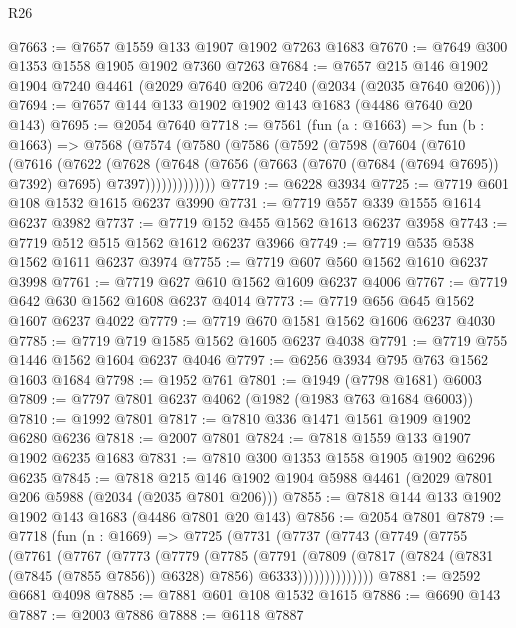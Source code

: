 \begin{lexlean}{R26}
\begin{coremodule}
@7663 := @7657 @1559 @133 @1907 @1902 @7263 @1683
@7670 := @7649 @300 @1353 @1558 @1905 @1902 @7360 @7263
@7684 := @7657 @215 @146 @1902 @1904 @7240 @4461 (@2029 @7640 @206 @7240 (@2034 (@2035 @7640 @206)))
@7694 := @7657 @144 @133 @1902 @1902 @143 @1683 (@4486 @7640 @20 @143)
@7695 := @2054 @7640
@7718 := @7561
    (fun (a : @1663) =>
    fun (b : @1663) =>
    @7568
      (@7574
        (@7580
          (@7586
            (@7592
              (@7598
                (@7604
                  (@7610
                    (@7616
                      (@7622
                        (@7628
                          (@7648
                            (@7656
                              (@7663 (@7670 (@7684 (@7694 @7695)) @7392) @7695)
                              @7397)))))))))))))
@7719 := @6228 @3934
@7725 := @7719 @601 @108 @1532 @1615 @6237 @3990
@7731 := @7719 @557 @339 @1555 @1614 @6237 @3982
@7737 := @7719 @152 @455 @1562 @1613 @6237 @3958
@7743 := @7719 @512 @515 @1562 @1612 @6237 @3966
@7749 := @7719 @535 @538 @1562 @1611 @6237 @3974
@7755 := @7719 @607 @560 @1562 @1610 @6237 @3998
@7761 := @7719 @627 @610 @1562 @1609 @6237 @4006
@7767 := @7719 @642 @630 @1562 @1608 @6237 @4014
@7773 := @7719 @656 @645 @1562 @1607 @6237 @4022
@7779 := @7719 @670 @1581 @1562 @1606 @6237 @4030
@7785 := @7719 @719 @1585 @1562 @1605 @6237 @4038
@7791 := @7719 @755 @1446 @1562 @1604 @6237 @4046
@7797 := @6256 @3934 @795 @763 @1562 @1603 @1684
@7798 := @1952 @761
@7801 := @1949 (@7798 @1681) @6003
@7809 := @7797 @7801 @6237 @4062 (@1982 (@1983 @763 @1684 @6003))
@7810 := @1992 @7801
@7817 := @7810 @336 @1471 @1561 @1909 @1902 @6280 @6236
@7818 := @2007 @7801
@7824 := @7818 @1559 @133 @1907 @1902 @6235 @1683
@7831 := @7810 @300 @1353 @1558 @1905 @1902 @6296 @6235
@7845 := @7818 @215 @146 @1902 @1904 @5988 @4461 (@2029 @7801 @206 @5988 (@2034 (@2035 @7801 @206)))
@7855 := @7818 @144 @133 @1902 @1902 @143 @1683 (@4486 @7801 @20 @143)
@7856 := @2054 @7801
@7879 := @7718
    (fun (n : @1669) =>
    @7725
      (@7731
        (@7737
          (@7743
            (@7749
              (@7755
                (@7761
                  (@7767
                    (@7773
                      (@7779
                        (@7785
                          (@7791
                            (@7809
                              (@7817
                                (@7824 (@7831 (@7845 (@7855 @7856)) @6328) @7856)
                                @6333))))))))))))))
@7881 := @2592 @6681 @4098
@7885 := @7881 @601 @108 @1532 @1615
@7886 := @6690 @143
@7887 := @2003 @7886
@7888 := @6118 @7887

\end{coremodule}
\end{lexlean}
